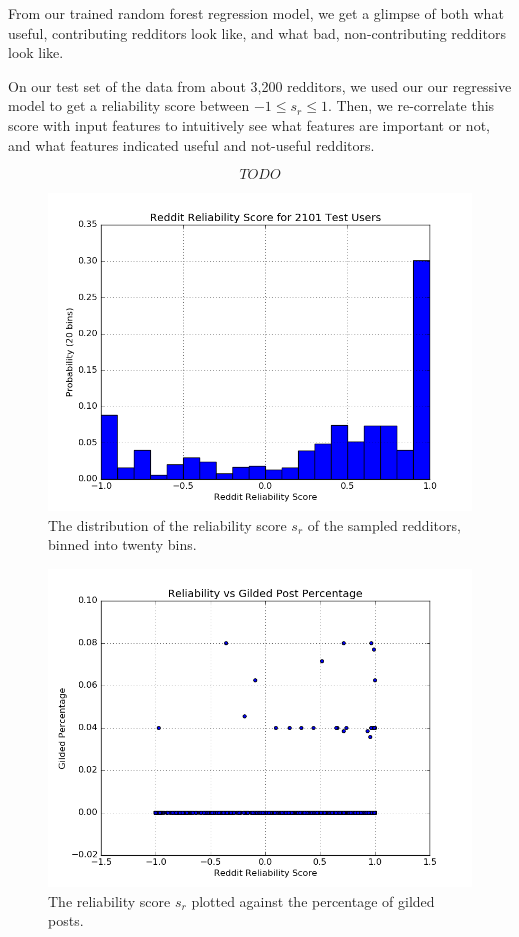 From our trained random forest regression model, we get a glimpse of both what
useful, contributing redditors look like, and what bad, non-contributing
redditors look like.

On our test set of the data from about 3,200 redditors, we used our our
regressive model to get a reliability score between $-1 \leq s_r \leq 1$. Then,
we re-correlate this score with input features to intuitively see what features
are important or not, and what features indicated useful and not-useful
redditors.

\[ TODO \]

\begin{figure}[tb]
    \centering
    \includegraphics[width=\linewidth]{figures/data_20.png}
    \caption{The distribution of the reliability score $s_r$ of the sampled redditors, binned into twenty bins.}
    \label{fig:data_20}
\end{figure}

\begin{figure}[tb]
    \centering
    \includegraphics[width=\linewidth]{figures/reliability_gilded.png}
    \caption{The reliability score $s_r$ plotted against the percentage of gilded posts.}
    \label{fig:reliability_gilded}
\end{figure}

